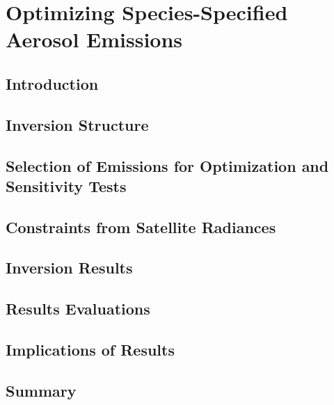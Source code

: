 \chapter{Optimizing Species-Specified Aerosol Emissions} \label{chap:}

\section{Introduction}

\section{Inversion Structure}

\section{Selection of Emissions for Optimization and Sensitivity Tests}

\section{Constraints from Satellite Radiances}

\section{Inversion Results}

\section{Results Evaluations} 

\section{Implications of Results}

\section{Summary}
